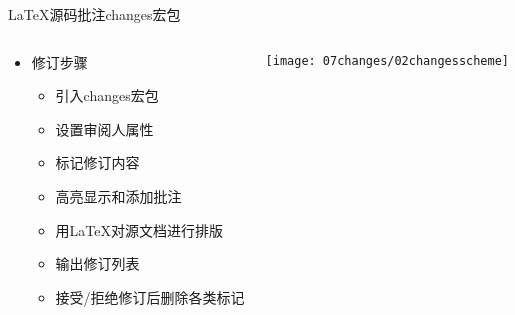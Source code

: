 \documentclass[fontset = none, t, aspectratio=169]{ctexbeamer}
\begin{document}
\begin{frame}{\LaTeX 源码批注}{changes宏包}
  \begin{columns}[T,onlytextwidth]
    \begin{spacing}{1.9}
    \begin{itemize}
    \item 修订步骤
      \begin{itemize}
      \item 引入changes宏包
      \item 设置审阅人属性
      \item 标记修订内容
      \item 高亮显示和添加批注
      \item 用\LaTeX 对源文档进行排版
      \item 输出修订列表
      \item 接受/拒绝修订后删除各类标记
      \end{itemize}
    \end{itemize}
    \end{spacing}
     \centering
    \texttt{[image: 07changes/02changesscheme]}        
  \end{columns}
\end{frame}
\end{document}
